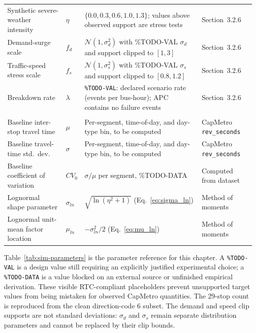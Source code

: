 \begin{table}[htbp]
\begin{tabularx}{\textwidth}{
>{\RaggedRight\arraybackslash}p{}
>{\RaggedRight\arraybackslash}p{}
X
>{\RaggedRight\arraybackslash}p{}
}
\midrule
\multicolumn{4}{l}{\textit{Swept / variable parameters}} \\
\midrule

Synthetic severe-weather intensity & $\eta$ & $\{0.0, 0.3, 0.6, 1.0, 1.3\}$; values above observed support are stress tests & Section~3.2.6 \\
Demand-surge scale & $f_d$ & $\mathcal{N}(1,\sigma_d^2)$ with \%TODO-VAL $\sigma_d$ and support clipped to $[1,3]$ & Section~3.2.6 \\
Traffic-speed stress scale & $f_s$ & $\mathcal{N}(1,\sigma_s^2)$ with \%TODO-VAL $\sigma_s$ and support clipped to $[0.8,1.2]$ & Section~3.2.6 \\
Breakdown rate & $\lambda$ & \texttt{\%TODO-VAL}: declared scenario rate (events per bus-hour); APC contains no failure events & Section~3.2.6 \\

\midrule
\multicolumn{4}{l}{\textit{Derived empirical/calibration parameters}} \\
\midrule

Baseline inter-stop travel time & $\mu$ & Per-segment, time-of-day, and day-type bin, to be computed & CapMetro \texttt{rev\_seconds} \\
Baseline travel-time std.\ dev.\ & $\sigma$ & Per-segment, time-of-day, and day-type bin, to be computed & CapMetro \texttt{rev\_seconds} \\
Baseline coefficient of variation & $CV_0$ & $\sigma/\mu$ per segment, \%TODO-DATA & Computed from dataset \\
Lognormal shape parameter & $\sigma_{ln}$ & $\sqrt{\ln(\eta^2+1)}$ (Eq.~\ref{eq:sigma_ln}) & Method of moments \\
Lognormal unit-mean factor location & $\mu_{ln}$ & $-\sigma_{ln}^2/2$ (Eq.~\ref{eq:mu_ln}) & Method of moments \\

\bottomrule
\end{tabularx}
\end{table}

Table~\ref{tab:sim-parameters} is the parameter reference for this chapter. A \texttt{\%TODO-VAL} is a design value still requiring an explicitly justified experimental choice; a \texttt{\%TODO-DATA} is a value blocked on an external source or unfinished empirical derivation. These visible RTC-compliant placeholders prevent unsupported target values from being mistaken for observed CapMetro quantities. The 29-stop count is reproduced from the clean direction-code 6 subset. The demand and speed clip supports are not standard deviations: $\sigma_d$ and $\sigma_s$ remain separate distribution parameters and cannot be replaced by their clip bounds.


